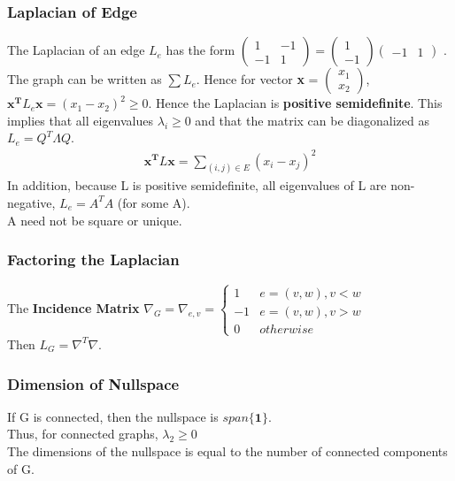 \documentclass[12pt, letterpaper]{report}
\begin{document}
    \subsubsection{Laplacian of Edge}
    The Laplacian of an edge $L_e$ has the form $\begin{pmatrix}
        1 & -1\\
        -1 & 1
    \end{pmatrix} = \begin{pmatrix}
        1\\-1
    \end{pmatrix}\begin{pmatrix}
        -1 & 1
    \end{pmatrix}$
    . The graph can be written as $\sum L_e$. Hence for vector \textbf{x} = $\begin{pmatrix}
        x_{1} \\
        x_{2}
    \end{pmatrix}$, $\mathbf{x^T} L_e \mathbf{x} = (x_1 - x_2)^2 \geq 0$. Hence the Laplacian is \textbf{positive semidefinite}. 
    This implies that all eigenvalues $\lambda_i \geq 0$ and that the matrix can be diagonalized as $L_e = Q^T \Lambda Q$.\\
    \begin{gather*}
        \mathbf{x^T} L \mathbf{x}=\sum_{(i,j)\in E}(x_i-x_j)^2
    \end{gather*}
    In addition, because L is positive semidefinite, all eigenvalues of L are non-negative, $L_e = A^T A$ (for some A).\\
    A need not be square or unique.

    \subsubsection{Factoring the Laplacian}
    The \textbf{Incidence Matrix} $\nabla_G = \nabla_{e, v} = \begin{cases}
        1 & e = (v, w), v < w\\
        -1 & e=(v,w), v>w\\
        0 & otherwise
    \end{cases}$\\
    Then $L_G = \nabla^T \nabla$.
    \subsubsection{Dimension of Nullspace}
    If G is connected, then the nullspace is $span\{\mathbf{1}\}$.\\
    \indent Thus, for connected graphs, $\lambda_2 \geq 0$\\
    \indent The dimensions of the nullspace is equal to the number of connected components of G.\\
\end{document}
